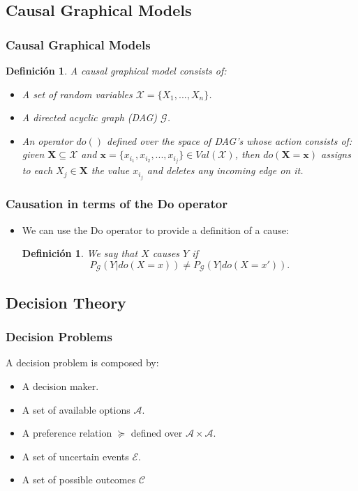\documentclass{beamer}
\theoremstyle{plain}
\newtheorem{defi}[teo]{Definición}
\begin{document}
	\subsection{Causal Graphical Models}
	\begin{frame}
	\frametitle{Causal Graphical Models}
	\begin{defi}
	A causal graphical model consists of:
	\begin{itemize}
	 \item A set of random variables $\mathcal{X}=\{ X_1,...,X_n \}$.
	 \item A directed acyclic graph (DAG) $\mathcal{G}$.
	 \item An operator $do()$ defined over the space of DAG's whose action consists of: given $\mathbf{X} \subseteq \mathcal{X}$ and $\mathbf{x} = \{ x_{i_1}, x_{i_2}, ... , x_{i_j} \} \in Val(\mathcal{X})$, then $do(\mathbf{X} = \mathbf{x} )$ assigns to each $X_j \in \mathbf{X}$ the value $x_{i_j}$ and deletes any incoming edge on it.
	 \end{itemize}
	 \end{defi}
	 \end{frame}
	 
	 \begin{frame}
	 \frametitle{Causation in terms of the Do operator}
	 \begin{itemize}
	 \item We can use the Do operator to provide a definition of a cause:
	 \begin{defi}
	 We say that $X$ \textit{causes} $Y$ if 
	\[ P_\mathcal{G}(Y | do(X=x)) \neq P_\mathcal{G}(Y | do(X=x')). \]
	 \end{defi}
	 \end{itemize}
	 \end{frame}
	 
	\subsection{Decision Theory}
	\begin{frame}
	\frametitle{Decision Problems}
	A decision problem is composed by:
	\begin{itemize}
	\item A decision maker.
	\item A set of available options $\mathcal{A}$.
	\item A preference relation $\succeq$ defined over $\mathcal{A} \times \mathcal{A}$.
	\item A set of uncertain events $\mathcal{E}$.
    \item A set of possible outcomes $\mathcal{C}$
	\end{itemize}
	\end{frame}		
	
\end{document}
